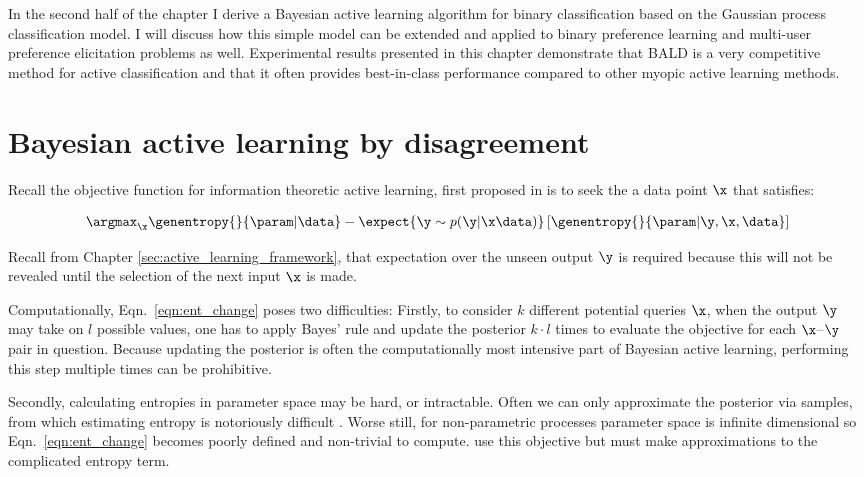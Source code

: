 In the second half of the chapter I derive a Bayesian active learning algorithm for binary classification based on the Gaussian process classification model. I will discuss how this simple model can be extended and applied to binary preference learning and multi-user preference elicitation problems as well. Experimental results presented in this chapter demonstrate that BALD is a very competitive method for active classification and that it often provides best-in-class performance compared to other myopic active learning methods.

\section{Bayesian active learning by disagreement}

Recall the objective function for information theoretic active learning, first proposed in \citep{lindley1956} is to seek the a data point $\x$ that satisfies:

\begin{align}	
	\label{eqn:ent_change}
	\argmax_{\x} \genentropy{}{\param | \data} - \expect{\y\sim p(\y|\x\data)} \left[ \genentropy{}{\param| \y, \x,\data} \right] 
\end{align}

Recall from Chapter \ref{sec:active_learning_framework}, that expectation over the unseen output $\y$ is required because this will not be revealed until the selection of the next input $\x$ is made.

Computationally, Eqn.\ \eqref{eqn:ent_change} poses two difficulties: Firstly, to consider $k$ different potential queries $\x$, when the output $\y$ may take on $l$ possible values, one has to apply Bayes' rule and update the posterior $k\cdot l$ times to evaluate the objective for each $\x$--$\y$ pair in question. Because updating the posterior is often the computationally most intensive part of Bayesian active learning, performing this step multiple times can be prohibitive.

Secondly, calculating entropies in parameter space may be hard, or intractable. Often we can only approximate the posterior via samples, from which estimating entropy is notoriously difficult \citep{panzeri2007}. Worse still, for non-parametric processes parameter space is infinite dimensional so Eqn.\ \eqref{eqn:ent_change} becomes poorly defined and non-trivial to compute. \citep{MacKay1992, Krishnapuram2004, Lawrence2004} use this objective but must make approximations to the complicated entropy term.

